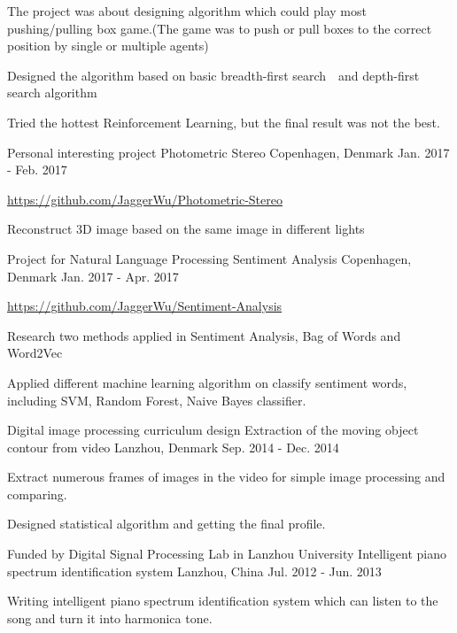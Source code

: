 \begin{cventries}
{\begin{cvitems}
        \item {The project was about designing algorithm which could play most pushing/pulling box game.(The game was to push or pull boxes to the correct position by single or multiple agents)}
        \item {Designed the algorithm based on basic breadth-first search　and depth-first search algorithm}
        \item {Tried the hottest Reinforcement Learning, but the final result was not the best.}
      \end{cvitems}
    }
  \cventry
    {Personal interesting project}
    {Photometric Stereo}
    {Copenhagen, Denmark}
    {Jan. 2017 - Feb. 2017}
    {
      \begin{cvitems}
        \item {\url{https://github.com/JaggerWu/Photometric-Stereo}}
        \item {Reconstruct 3D image based on the same image in different lights}
      \end{cvitems} 
    }
  \cventry
    {Project for Natural Language Processing}
    {Sentiment Analysis}
    {Copenhagen, Denmark}
    {Jan. 2017 - Apr. 2017}
    {
      \begin{cvitems}
        \item {\url{https://github.com/JaggerWu/Sentiment-Analysis}}
        \item {Research two methods applied in Sentiment Analysis, Bag of Words and Word2Vec}
        \item {Applied different machine learning algorithm on classify sentiment words, including SVM, Random Forest, Naive Bayes classifier.}
      \end{cvitems} 
    }
  \cventry
    {Digital image processing curriculum design}
    {Extraction of  the moving object contour from video}
    {Lanzhou, Denmark}
    {Sep. 2014 - Dec. 2014}
    {
      \begin{cvitems}
        \item {Extract numerous frames of images in the video for simple image processing and comparing.}
        \item {Designed statistical algorithm and getting the final profile.}
      \end{cvitems} 
    }
  \cventry
    {Funded by Digital Signal Processing Lab in Lanzhou University}
    {Intelligent piano spectrum identification system}
    {Lanzhou, China}
    {Jul. 2012 - Jun. 2013}
    {
      \begin{cvitems}
        \item {Writing intelligent piano spectrum identification system which can listen to the song and turn it into harmonica tone.}

\end{cvitems}}
\end{cventries}
